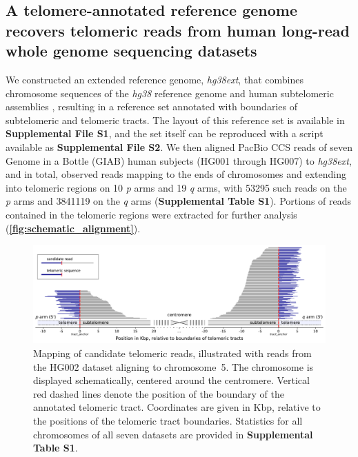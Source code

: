 \documentclass{article}
\begin{document}
\subsection*{A telomere-annotated reference genome recovers telomeric reads from human long-read whole genome sequencing datasets}
We constructed an extended reference genome, \textit{hg38ext}, that combines chromosome sequences of the \textit{hg38} reference genome \cite{grch38,hg38} and human subtelomeric assemblies \cite{riethman2014}, resulting in a reference set annotated with boundaries of subtelomeric and telomeric tracts. %
The layout of this reference set is available in \textbf{Supplemental File S1}, and the set itself can be reproduced with a script available as \textbf{Supplemental File S2}.
We then aligned PacBio CCS reads of seven Genome in a Bottle (GIAB) human subjects (HG001 through HG007) to \textit{hg38ext}, and in total, observed reads mapping to the ends of chromosomes and extending into telomeric regions on 10 \textit{p} arms and 19 \textit{q} arms, with 53\textendash{}295 such reads on the \textit{p} arms and 384\textendash{}1119 on the \textit{q} arms (\textbf{Supplemental Table S1}).
Portions of reads contained in the telomeric regions were extracted for further analysis (\textbf{\autoref{fig:schematic_alignment}}).

\begin{figure}[h!] \centering %
\includegraphics[height=.75\textheight,width=\textwidth,keepaspectratio]{renders/figures/Figure-1.pdf}
\caption{
     \small Mapping of candidate telomeric reads, illustrated with reads from the HG002 dataset aligning to \mbox{chromosome 5.}
     The chromosome is displayed schematically, centered around the centromere.
     Vertical red dashed lines denote the position of the boundary of the annotated telomeric tract.
     Coordinates are given in Kbp, relative to the positions of the telomeric tract boundaries.
     Statistics for all chromosomes of all seven datasets are provided in \textbf{Supplemental Table S1}.
}
\label{fig:schematic_alignment}
\end{figure}
\end{document}
